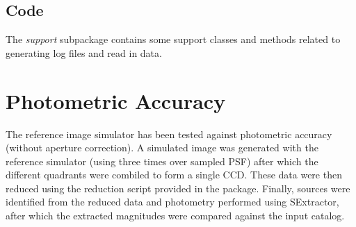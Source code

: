 \documentclass[a4paper,11pt,english]{sphinxmanual}
\begin{document}
\section{Code}
\label{index:code}
The \emph{support} subpackage contains some support classes and methods related to generating log files and read in
data.


\chapter{Photometric Accuracy}
\label{index:photometric-accuracy}
The reference image simulator has been tested against photometric accuracy (without aperture correction). A
simulated image was generated with the reference simulator (using three times over sampled PSF) after
which the different quadrants were combiled to form a single CCD. These data were then reduced using the
reduction script provided in the package. Finally, sources were identified from the reduced data and photometry performed
using SExtractor, after which the extracted magnitudes were compared against the input catalog.
\end{document}
